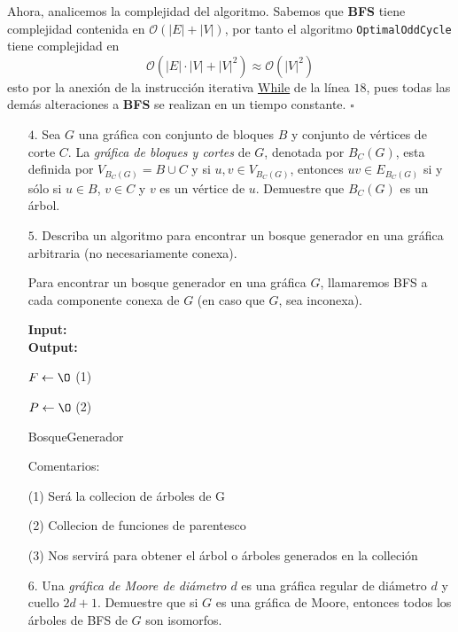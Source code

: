 \documentclass{article}
\newcommand{\code}[1]{\textcolor{white!25!black}{\texttt{#1}}}
\begin{document}
Ahora, analicemos la complejidad del algoritmo. Sabemos que \textbf{BFS}
tiene complejidad contenida en $\mathcal{O}(|E| + |V|)$, por tanto el
algoritmo \code{OptimalOddCycle} tiene complejidad en
\[
\mathcal{O}(|E|\cdot|V| + |V|^2) \approx \mathcal{O}(|V|^2)
\]
esto por la anexi\'on de la instrucci\'on iterativa \underline{While} de
la l\'inea $18$, pues todas las dem\'as alteraciones a \textbf{BFS} se
realizan en un tiempo constante.
\hfill $\square$
\begin{enumerate}
\item[$4$.] Sea $G$ una gr\'afica con conjunto de bloques $B$ y conjunto de
  v\'ertices de corte $C$.   La {\em gr\'afica de bloques y cortes} de $G$,
  denotada por $B_C (G)$, esta definida por $V_{B_C (G)} = B \cup C$ y
  si $u, v \in V_{B_C (G)}$, entonces $uv \in E_{B_C (G)}$ si y s\'olo si
  $u \in B$, $v \in C$ y $v$ es un v\'ertice de $u$.   Demuestre que
  $B_C (G)$ es un \'arbol.
  
\item[$5$.] Describa un algoritmo para encontrar un bosque generador en una
  gr\'afica arbitraria (no necesariamente conexa).

  Para encontrar un bosque generador en una gráfica $G$, llamaremos BFS a cada componente conexa de $G$ (en caso que $G$, sea inconexa).\\

  \begin{algorithm}[H]
      \textbf{Input:} \\
      \textbf{Output:} 

      $F \leftarrow \O$  (1)

      $P \leftarrow \O$  (2)

      \caption{BosqueGenerador}
  \end{algorithm}

  Comentarios:

  (1) Será la collecion de árboles de G

  (2) Collecion de funciones de parentesco

  (3) Nos servirá para obtener el árbol o árboles generados en la colleción

  
\item[$6$.] Una {\em gr\'afica de Moore de di\'ametro $d$} es una gr\'afica
  regular de di\'ametro $d$ y cuello $2d+1$.   Demuestre que si $G$ es
  una gr\'afica de Moore, entonces todos los \'arboles de BFS de $G$
  son isomorfos.

\end{enumerate}
\end{document}
